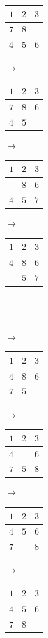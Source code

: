 \documentclass{article}
\begin{document}
\begin{sffamily}
\begin{center}
\begin{tabular}{|c|c|c|}
\hline
$1$ & $2$ & $3$ \\
\hline
$7$ & $8$ & \\
\hline
$4$ & $5$ & $6$ \\
\hline
\end{tabular}
$\rightarrow$
\begin{tabular}{|c|c|c|}
\hline
$1$ & $2$ & $3$ \\
\hline
$7$ & $8$ & $6$\\
\hline
$4$ & $5$ & \\
\hline
\end{tabular}
$\rightarrow$
\begin{tabular}{|c|c|c|}
\hline
$1$ & $2$ & $3$ \\
\hline
 & $8$ & $6$\\
\hline
$4$ & $5$ & $7$\\
\hline
\end{tabular}
$\rightarrow$
\begin{tabular}{|c|c|c|}
\hline
$1$ & $2$ & $3$ \\
\hline
$4$ & $8$ & $6$\\
\hline
 & $5$ & $7$\\
\hline
\end{tabular}\\$ $\\$ $\\
$\rightarrow$
\begin{tabular}{|c|c|c|}
\hline
$1$ & $2$ & $3$ \\
\hline
$4$ & $8$ & $6$\\
\hline
$7$ & $5$ & \\
\hline
\end{tabular}
$\rightarrow$
\begin{tabular}{|c|c|c|}
\hline
$1$ & $2$ & $3$ \\
\hline
$4$ &  & $6$\\
\hline
$7$ & $5$ & $8$\\
\hline
\end{tabular}
$\rightarrow$
\begin{tabular}{|c|c|c|}
\hline
$1$ & $2$ & $3$ \\
\hline
$4$ & $5$ & $6$\\
\hline
$7$ &  &$8$ \\
\hline
\end{tabular}
$\rightarrow$
\begin{tabular}{|c|c|c|}
\hline
$1$ & $2$ & $3$ \\
\hline
$4$ & $5$ & $6$\\
\hline
$7$ & $8$ & \\
\hline
\end{tabular}
\end{center}


\end{sffamily}
\end{document}
